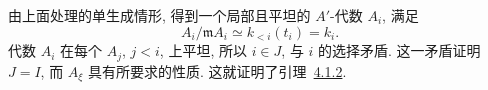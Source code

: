 由上面处理的单生成情形, 得到一个局部且平坦的 \(A'\)-代数 \(A_i\), 满足
\[
  A_i/\mathfrak mA_i\simeq k_{<i}(t_i)=k_i.
\]
代数 \(A_i\) 在每个 \(A_j\), \(j<i\), 上平坦,
所以 \(i\in J\), 与 \(i\) 的选择矛盾.
这一矛盾证明 \(J=I\), 而 \(A_\xi\) 具有所要求的性质.
这就证明了引理~\hyperref[lem:sga3-V-4.1.2]{4.1.2}.
